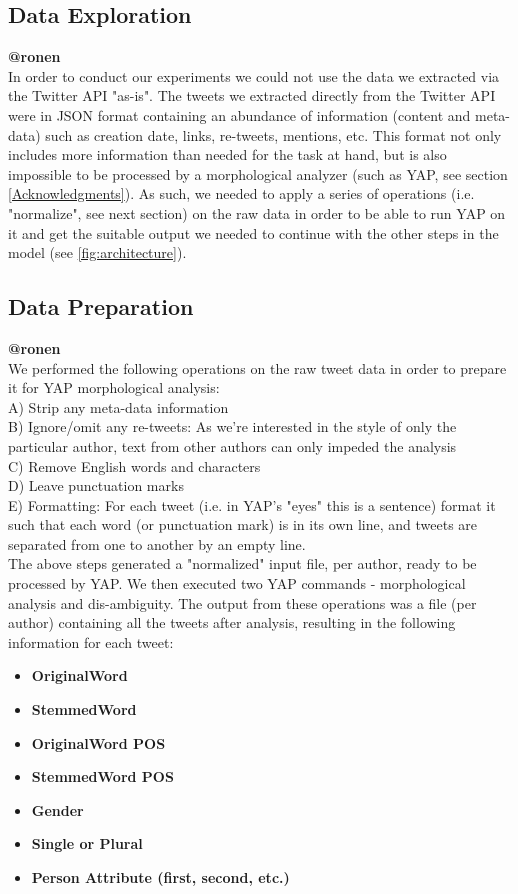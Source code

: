 \documentclass[a4paper]{article}
\begin{document}
\subsection{Data Exploration}
\textbf{@ronen}\\
In order to conduct our experiments we could not use the data we extracted via the Twitter API "as-is". The tweets we extracted directly from the Twitter API were in JSON format containing an abundance of information (content and meta-data) such as creation date, links, re-tweets, mentions, etc. This format not only includes more information than needed for the task at hand, but is also impossible to be processed by a morphological analyzer (such as YAP, see section \ref{Acknowledgments}). As such, we needed to apply a series of operations (i.e. "normalize", see next section) on the raw data in order to be able to run YAP on it and get the suitable output we needed to continue with the other steps in the model (see \ref{fig:architecture}).

\subsection{Data Preparation}
\textbf{@ronen}\\
We performed the following operations on the raw tweet data in order to prepare it for YAP morphological analysis:\\
A) Strip any meta-data information\\
B) Ignore/omit any re-tweets: As we're interested in the style of only the particular author, text from other authors can only impeded the analysis\\
C) Remove English words and characters\\
D) Leave punctuation marks\\
E) Formatting: For each tweet (i.e. in YAP's "eyes" this is a sentence) format it such that each word (or punctuation mark) is in its own line, and tweets are separated from one to another by an empty line.\\
The above steps generated a "normalized" input file, per author, ready to be processed by YAP. We then executed two YAP commands - morphological analysis and dis-ambiguity. The output from these operations was a file (per author) containing all the tweets after analysis, resulting in the following information for each tweet:\\
\begin{itemize}
\item \textbf{OriginalWord}
\item \textbf{StemmedWord}
\item \textbf{OriginalWord POS}
\item \textbf{StemmedWord POS}
\item \textbf{Gender}
\item \textbf{Single or Plural}
\item \textbf{Person Attribute (first, second, etc.)}
\end{itemize}
\end{document}
